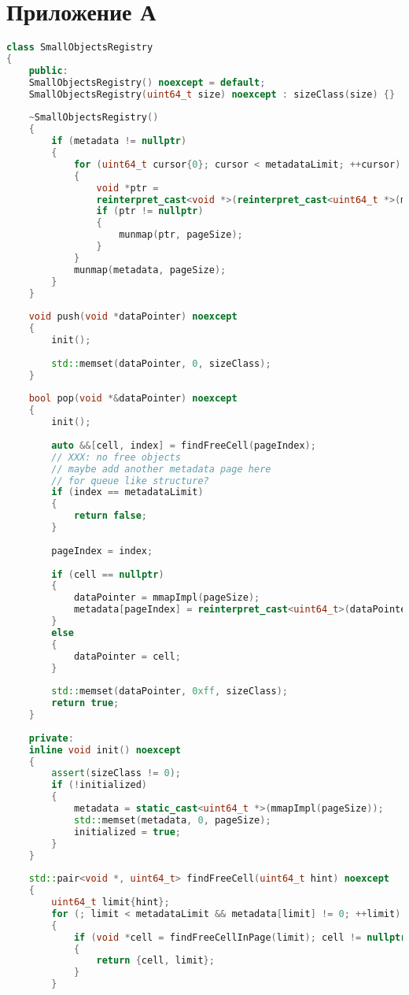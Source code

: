 \chapter{Приложение А}
\label{cha:appendix1}


\captionsetup{justification=centering}

\begin{lstlisting}[language=c++,caption={Код аллокатора}]
class SmallObjectsRegistry
{
	public:
	SmallObjectsRegistry() noexcept = default;
	SmallObjectsRegistry(uint64_t size) noexcept : sizeClass(size) {}
	
	~SmallObjectsRegistry()
	{
		if (metadata != nullptr)
		{
			for (uint64_t cursor{0}; cursor < metadataLimit; ++cursor)
			{
				void *ptr =
				reinterpret_cast<void *>(reinterpret_cast<uint64_t *>(metadata)[cursor]);
				if (ptr != nullptr)
				{
					munmap(ptr, pageSize);
				}
			}
			munmap(metadata, pageSize);
		}
	}
	
	void push(void *dataPointer) noexcept
	{
		init();
		
		std::memset(dataPointer, 0, sizeClass);
	}
	
	bool pop(void *&dataPointer) noexcept
	{
		init();
		
		auto &&[cell, index] = findFreeCell(pageIndex);
		// XXX: no free objects
		// maybe add another metadata page here
		// for queue like structure?
		if (index == metadataLimit)
		{
			return false;
		}
		
		pageIndex = index;
		
		if (cell == nullptr)
		{
			dataPointer = mmapImpl(pageSize);
			metadata[pageIndex] = reinterpret_cast<uint64_t>(dataPointer);
		}
		else
		{
			dataPointer = cell;
		}
		
		std::memset(dataPointer, 0xff, sizeClass);
		return true;
	}
	
	private:
	inline void init() noexcept
	{
		assert(sizeClass != 0);
		if (!initialized)
		{
			metadata = static_cast<uint64_t *>(mmapImpl(pageSize));
			std::memset(metadata, 0, pageSize);
			initialized = true;
		}
	}
	
	std::pair<void *, uint64_t> findFreeCell(uint64_t hint) noexcept
	{
		uint64_t limit{hint};
		for (; limit < metadataLimit && metadata[limit] != 0; ++limit)
		{
			if (void *cell = findFreeCellInPage(limit); cell != nullptr)
			{
				return {cell, limit};
			}
		}
		

\end{lstlisting}
